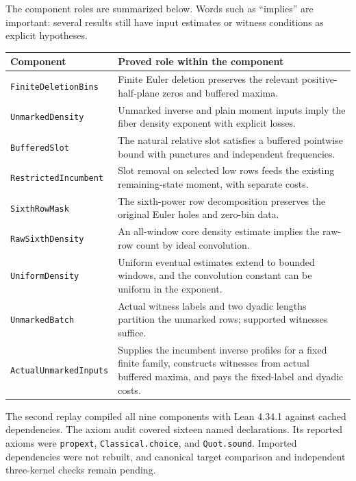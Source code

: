 \documentclass[11pt]{article}
\theoremstyle{definition}
\newcommand{\code}[1]{\texttt{\small #1}}
\begin{document}
The component roles are summarized below. Words such as ``implies'' are
important: several results still have input estimates or witness
conditions as explicit hypotheses.
\begin{center}\small
\begin{tabularx}{\textwidth}{@{}l>{\raggedright\arraybackslash}X@{}}
\toprule
Component & Proved role within the component\\
\midrule
\code{FiniteDeletionBins} & Finite Euler deletion preserves the relevant positive-half-plane zeros and buffered maxima.\\
\code{UnmarkedDensity} & Unmarked inverse and plain moment inputs imply the fiber density exponent with explicit losses.\\
\code{BufferedSlot} & The natural relative slot satisfies a buffered pointwise bound with punctures and independent frequencies.\\
\code{RestrictedIncumbent} & Slot removal on selected low rows feeds the existing remaining-state moment, with separate costs.\\
\code{SixthRowMask} & The sixth-power row decomposition preserves the original Euler holes and zero-bin data.\\
\code{RawSixthDensity} & An all-window core density estimate implies the raw-row count by ideal convolution.\\
\code{UniformDensity} & Uniform eventual estimates extend to bounded windows, and the convolution constant can be uniform in the exponent.\\
\code{UnmarkedBatch} & Actual witness labels and two dyadic lengths partition the unmarked rows; supported witnesses suffice.\\
\code{ActualUnmarkedInputs} & Supplies the incumbent inverse profiles for a fixed finite family, constructs witnesses from actual buffered maxima, and pays the fixed-label and dyadic costs.\\
\bottomrule
\end{tabularx}
\end{center}
The second replay compiled all nine components with Lean 4.34.1 against
cached dependencies. The axiom audit covered sixteen named declarations.
Its reported axioms were \code{propext}, \code{Classical.choice}, and
\code{Quot.sound}. Imported dependencies were not rebuilt, and canonical
target comparison and independent three-kernel checks remain pending.
\end{document}
